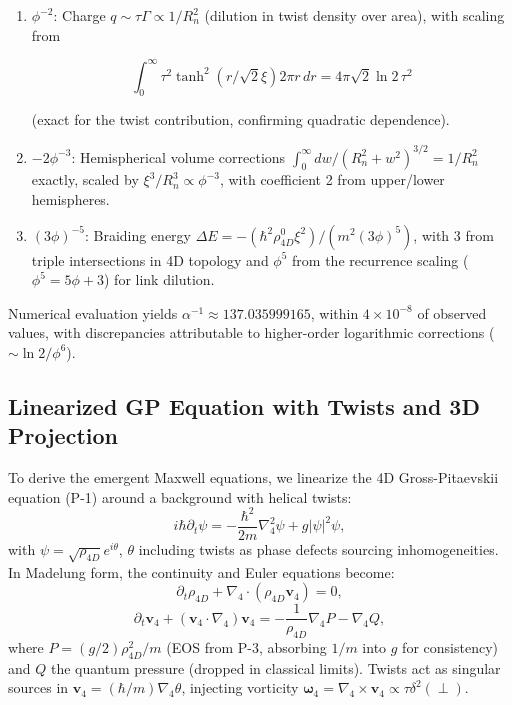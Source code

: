 \documentclass{article}
\begin{document}
\begin{enumerate}
\item \(\phi^{-2}\): Charge \(q \sim \tau \Gamma \propto 1/R_n^2\) (dilution in twist density over area), with scaling from

\[\int_0^\infty \tau^2 \tanh^2(r / \sqrt{2} \xi) 2\pi r \, dr = 4\pi \sqrt{2} \ln 2 \, \tau^2\]

(exact for the twist contribution, confirming quadratic dependence).
\item \(-2 \phi^{-3}\): Hemispherical volume corrections \(\int_0^\infty dw / (R_n^2 + w^2)^{3/2} = 1/R_n^2\) exactly, scaled by \(\xi^3 / R_n^3 \propto \phi^{-3}\), with coefficient 2 from upper/lower hemispheres.
\item \((3 \phi)^{-5}\): Braiding energy \(\Delta E = - (\hbar^2 \rho_{4D}^0 \xi^2) / (m^2 (3 \phi)^5)\), with 3 from triple intersections in 4D topology and \(\phi^5\) from the recurrence scaling (\(\phi^5 = 5\phi + 3\)) for link dilution.
\end{enumerate}

Numerical evaluation yields \(\alpha^{-1} \approx 137.035999165\), within \(4 \times 10^{-8}\) of observed values, with discrepancies attributable to higher-order logarithmic corrections (\(\sim \ln 2 / \phi^6\)).

\subsection{Linearized GP Equation with Twists and 3D Projection}

To derive the emergent Maxwell equations, we linearize the 4D Gross-Pitaevskii equation (P-1) around a background with helical twists:
\begin{equation}
i \hbar \partial_t \psi = -\frac{\hbar^2}{2 m} \nabla_4^2 \psi + g |\psi|^2 \psi,
\end{equation}
with $\psi = \sqrt{\rho_{4D}} e^{i \theta}$, $\theta$ including twists as phase defects sourcing inhomogeneities. In Madelung form, the continuity and Euler equations become:
\begin{equation}
\partial_t \rho_{4D} + \nabla_4 \cdot (\rho_{4D} \mathbf{v}_4) = 0,
\end{equation}
\begin{equation}
\partial_t \mathbf{v}_4 + (\mathbf{v}_4 \cdot \nabla_4) \mathbf{v}_4 = -\frac{1}{\rho_{4D}} \nabla_4 P - \nabla_4 Q,
\end{equation}
where $P = (g / 2) \rho_{4D}^2 / m$ (EOS from P-3, absorbing $1/m$ into $g$ for consistency) and $Q$ the quantum pressure (dropped in classical limits). Twists act as singular sources in $\mathbf{v}_4 = (\hbar / m) \nabla_4 \theta$, injecting vorticity $\boldsymbol{\omega}_4 = \nabla_4 \times \mathbf{v}_4 \propto \tau \delta^2(\perp)$.
\end{document}
